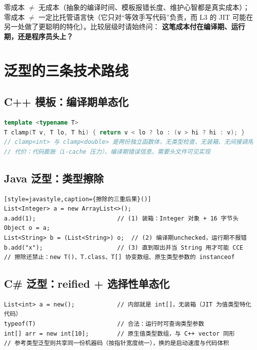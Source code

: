 \documentclass[12pt,a4paper,fontset=fandol]{ctexbook}
\begin{document}
\begin{warning}[title=两个流行的误读]
零成本 $\neq$ 无成本（抽象的编译时间、模板报错长度、维护心智都是真实成本）；
零成本 $\neq$ 一定比托管语言快（它只对``等效手写代码''负责，而 L3 的 JIT
可能在另一处做了更聪明的特化）。比较层级时请始终问：
\textbf{这笔成本付在编译期、运行期，还是程序员头上？}
\end{warning}

\section{泛型的三条技术路线}

\subsection*{C++ 模板：编译期单态化}

\begin{lstlisting}[language=C++,caption={模板在链接后已``消失''：每个实例各得一份机器码}]
template <typename T>
T clamp(T v, T lo, T hi) { return v < lo ? lo : (v > hi ? hi : v); }
// clamp<int> 与 clamp<double> 是两份独立函数体，无类型检查、无装箱、无间接调用
// 代价：代码膨胀（i-cache 压力）、编译期错误信息、需要头文件可见实现
\end{lstlisting}

\subsection*{Java 泛型：类型擦除}

\begin{lstlisting}[style=javastyle,caption={擦除的三重后果}()]
List<Integer> a = new ArrayList<>();
a.add(1);                       // (1) 装箱：Integer 对象 + 16 字节头
Object o = a;
List<String> b = (List<String>) o;  // (2) 编译期unchecked，运行期不报错
b.add("x");                     // (3) 直到取出并当 String 用才可能 CCE
// 擦除还禁止：new T()、T.class、T[] 协变数组、原生类型参数的 instanceof
\end{lstlisting}

\subsection*{C\# 泛型：reified + 选择性单态化}

\begin{lstlisting}[style=csharpstyle,caption={类型参数在运行时真实存在}]
List<int> a = new();            // 内部就是 int[]，无装箱（JIT 为值类型特化代码）
typeof(T)                       // 合法：运行时可查询类型参数
int[] arr = new int[10];        // 原生值类型数组，与 C++ vector 同形
// 参考类型泛型则共享同一份机器码（按指针宽度统一），换的是启动速度与代码体积
\end{lstlisting}
\end{document}
